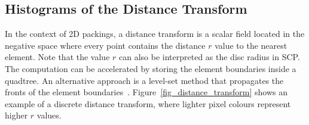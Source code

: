 \subsection{Histograms of the Distance Transform}




\newtext
{
In the context of 2D packings, a distance transform is a scalar field located in the negative space where every point
contains the distance $r$ value to the nearest  element.
Note that the value $r$ can also be interpreted as the disc radius in SCP.
The computation can be accelerated by storing the element boundaries inside a quadtree.
An alternative approach is a level-set method that propagates the fronts of the element boundaries~\cite{Osher1988}.
Figure~\ref{fig_distance_transform} shows an example of a discrete distance transform,
where lighter pixel colours represent higher $r$ values.
}

